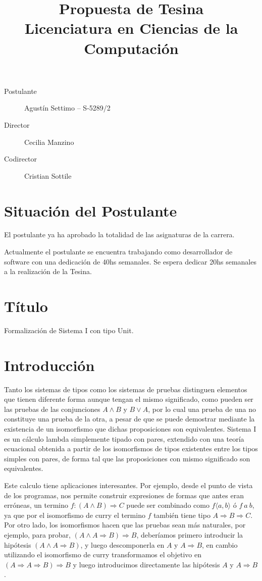 \documentclass[a4paper,10pt]{article}
\title{Propuesta de Tesina \\ Licenciatura en Ciencias de la Computación}
\author{}
\begin{document}
\maketitle

\begin{description}
 \item[Postulante] Agustín Settimo -- S-5289/2
 \item[Director] Cecilia Manzino
 \item[Codirector] Cristian Sottile
\end{description}

\section{Situación del Postulante}

El postulante ya ha aprobado la totalidad de las asignaturas de la carrera.

Actualmente el postulante se encuentra trabajando como desarrollador de software con una dedicación de 40hs semanales. Se espera dedicar 20hs semanales a la realización de la Tesina.

\section{Título}

Formalización de Sistema I con tipo Unit.

\section{Introducción}

Tanto los sistemas de tipos como los sistemas de pruebas distinguen elementos que tienen diferente forma aunque tengan el mismo significado, como pueden ser las pruebas de las conjunciones $A \wedge B$ y $B \vee A$, por lo cual una prueba de una no constituye una prueba de la otra, a pesar de que se puede demostrar mediante la existencia de un isomorfismo que dichas proposiciones son equivalentes. Sistema I es un cálculo lambda simplemente tipado con pares, extendido con una teoría ecuacional obtenida a partir de los isomorfismos de tipos existentes entre los tipos simples con pares, de forma tal que las proposiciones con mismo significado son equivalentes.

Este calculo tiene aplicaciones interesantes. Por ejemplo, desde el punto de vista de los programas, nos permite construir expresiones de formas que antes eran erróneas, un termino $f : (A \wedge B) \Rightarrow C$ puede ser combinado como $f \langle a, b \rangle$ ó $f \: a \: b$, ya que por el isomorfismo de curry el termino $f$ también tiene tipo $A \Rightarrow B \Rightarrow C$.
Por otro lado, los isomorfismos hacen que las pruebas sean más naturales, por ejemplo, para probar, $(A \wedge A \Rightarrow  B) \Rightarrow B$, deberíamos primero introducir la hipótesis $(A \wedge A \Rightarrow  B)$, y luego descomponerla en $A$ y $A \Rightarrow B$, en cambio utilizando el isomorfismo de curry transformamos el objetivo en $(A \Rightarrow A \Rightarrow  B) \Rightarrow B$ y luego introducimos directamente las hipótesis $A$ y $A \Rightarrow B$.
\end{document}
